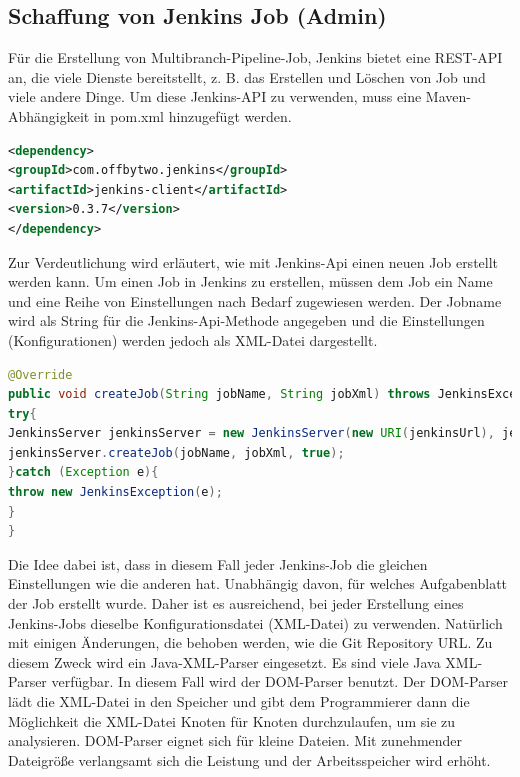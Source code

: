 \documentclass[a4paper,12pt,oneside]{book}
\begin{document}
\subsection{Schaffung von Jenkins Job (Admin)}
Für die Erstellung von Multibranch-Pipeline-Job, Jenkins bietet eine REST-API an, die viele Dienste bereitstellt, z. B. das Erstellen und Löschen von Job und viele andere Dinge. Um diese Jenkins-API zu verwenden, muss eine Maven-Abhängigkeit in pom.xml hinzugefügt werden.
\begin{lstlisting}[language=XML,caption=pom.xml - Jenkins-Api]
<dependency>
<groupId>com.offbytwo.jenkins</groupId>
<artifactId>jenkins-client</artifactId>
<version>0.3.7</version>
</dependency>
\end{lstlisting}
Zur Verdeutlichung wird erläutert, wie mit Jenkins-Api einen neuen Job erstellt werden kann. Um einen Job in Jenkins zu erstellen, müssen dem Job  ein Name und eine Reihe von Einstellungen nach Bedarf  zugewiesen werden.
\newline
Der Jobname wird als String  für die Jenkins-Api-Methode angegeben und die Einstellungen (Konfigurationen) werden jedoch als XML-Datei dargestellt.
\begin{lstlisting}[language=JAVA,caption=JenkinsServiceImp - createJob]
@Override
public void createJob(String jobName, String jobXml) throws JenkinsException {
try{
JenkinsServer jenkinsServer = new JenkinsServer(new URI(jenkinsUrl), jenkinsUser, jenkinsPassword);
jenkinsServer.createJob(jobName, jobXml, true);
}catch (Exception e){
throw new JenkinsException(e);
} 
}
\end{lstlisting}
Die Idee dabei ist, dass in diesem Fall jeder Jenkins-Job die gleichen Einstellungen wie die anderen hat. Unabhängig davon, für welches Aufgabenblatt der Job erstellt wurde. Daher ist es ausreichend, bei jeder Erstellung eines Jenkins-Jobs dieselbe Konfigurationsdatei (XML-Datei) zu verwenden. Natürlich mit einigen Änderungen, die behoben werden, wie die Git Repository URL. Zu diesem Zweck wird ein Java-XML-Parser eingesetzt. Es sind viele Java XML-Parser verfügbar. In diesem Fall wird der DOM-Parser benutzt. Der DOM-Parser lädt die XML-Datei in den Speicher und gibt dem Programmierer dann die Möglichkeit die XML-Datei Knoten für Knoten durchzulaufen, um sie zu analysieren. DOM-Parser eignet sich für kleine Dateien. Mit zunehmender Dateigröße verlangsamt sich die Leistung und der Arbeitsspeicher wird erhöht.
\end{document}
